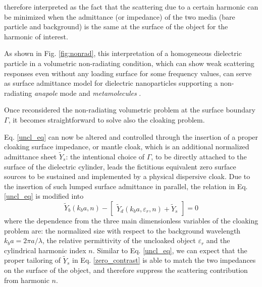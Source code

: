 \documentclass[reprint, showpacs, amsmath,amssymb, aps,
prb]{revtex4-1}
\begin{document}
therefore interpreted as the fact that the scattering due to a certain harmonic can be minimized when the admittance (or impedance) of the two media (bare particle and background) is the same at the surface of the object for the harmonic of interest.

As shown in Fig. \ref{fig:nonrad}, this interpretation of a homogeneous dielectric particle in a volumetric non-radiating condition, which can show weak scattering responses even without any loading surface for some frequency values, can serve as surface admittance model for dielectric nanoparticles supporting a non-radiating  \textit{anapole} mode and \textit{metamolecules} \cite{ana1,ana2}.

Once reconsidered the non-radiating volumetric problem at the surface boundary $\Gamma$, it becomes straightforward to solve also the cloaking problem.

Eq. \eqref{uncl_eq} can now be altered and controlled through the insertion of a proper cloaking surface impedance, or mantle cloak, which is an additional normalized admittance sheet $\widetilde{Y}_s$: the intentional choice of $\Gamma$, to be directly attached to the surface of the dielectric cylinder, leads the fictitious equivalent zero surface sources to be sustained and implemented by a physical dispersive cloak. Due to the insertion of such lumped surface admittance in parallel, the relation in Eq. \eqref{uncl_eq} is modified into
%
\begin{equation}
\widetilde{Y}_b(k_b a, n)-\begin{bmatrix}
\widetilde{Y}_d(k_b a,\varepsilon_r, n)+\widetilde{Y}_s\end{bmatrix}=0
\label{zero_contrast}
\end{equation} 
%
where the dependence from the three
main dimensionless variables of the cloaking problem are: the normalized size with respect to the background wavelength $k_b a=2\pi a/\lambda$, the relative permittivity of the uncloaked object $\varepsilon_r$ and the cylindrical harmonic index $n$.  
Similar to Eq. \eqref{uncl_eq}, we can expect that the proper tailoring of $\widetilde{Y}_s$ in Eq. \eqref{zero_contrast} is able to match the two impedances on the surface of the object, and therefore suppress the scattering contribution from harmonic $n$.
\end{document}

